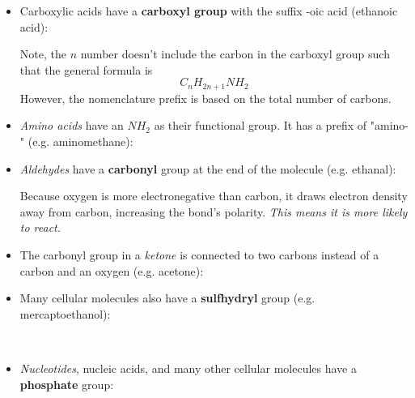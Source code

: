 \documentclass[letterpaper]{article}
\numberwithin{equation}{section}
\theoremstyle{classic}
\begin{document}
\begin{itemize}
    \item Carboxylic acids have a \textbf{carboxyl group} with the suffix -oic acid (ethanoic acid): \label{sec:carboxylic}
    \begin{center}
    \end{center}
    \begin{tip}
    Note, the $n$ number doesn't include the carbon in the carboxyl group such that the general formula is
    $$C_nH_{2n+1}NH_2$$
    However, the nomenclature prefix is based on the total number of carbons.
    \end{tip}
    \item \textit{Amino acids} have an $NH_2$ as their functional group. It has a prefix of "amino-" (e.g. aminomethane):
    \begin{center}
    \end{center}

    \item \textit{Aldehydes} have a \textbf{carbonyl} group at the end of the molecule (e.g. ethanal):
    \begin{center}
    \end{center}
    
    Because oxygen is more electronegative than carbon, it draws electron density away from carbon, increasing the bond's polarity. \textit{This means it is more likely to react.}
    \item The carbonyl group in a \textit{ketone} is connected to two carbons instead of a carbon and an oxygen (e.g. acetone):
    \begin{center}
    \end{center}
    \item Many cellular molecules also have a \textbf{sulfhydryl}  group (e.g. mercaptoethanol):
    \begin{center}
         \\
    \end{center}
    \item \textit{Nucleotides}, nucleic acids, and many other cellular molecules have a \textbf{phosphate} group:
    \begin{center}
    \end{center}

\end{itemize}
\end{document}
